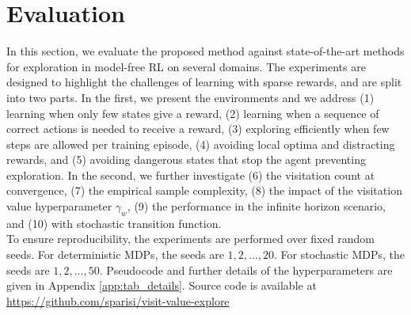 \documentclass{article}
\begin{document}
\section{Evaluation}
\label{sec:eval}
In this section, we evaluate the proposed method against state-of-the-art methods for exploration in model-free RL on several domains. 
The experiments are designed to highlight the challenges of learning with sparse rewards, and are split into two parts. In the first, we present the environments and we address (1) learning when only few states give a reward, (2) learning when a sequence of correct actions is needed to receive a reward, (3) exploring efficiently when few steps are allowed per training episode, (4) avoiding local optima and distracting rewards, and (5) avoiding dangerous states that stop the agent preventing exploration. 
In the second, we further investigate (6) the visitation count at convergence, (7) the empirical sample complexity, (8) the impact of the visitation value hyperparameter $\gamma_w$, (9) the performance in the infinite horizon scenario, and (10) with stochastic transition function.
\\
To ensure reproducibility, the experiments are performed over fixed random seeds. For deterministic MDPs, the seeds are $1, 2, \ldots, 20$. For stochastic MDPs, the seeds are $1, 2, \ldots, 50$.
Pseudocode and further details of the hyperparameters are given in Appendix \ref{app:tab_details}.
Source code is available at \url{https://github.com/sparisi/visit-value-explore}
\end{document}
